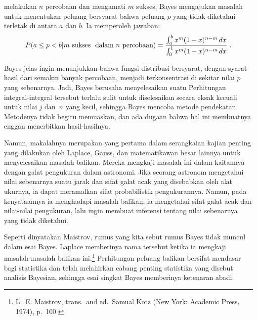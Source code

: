 melakukan
$n$ percobaan dan mengamati $m$ sukses.  Bayes mengajukan masalah untuk menentukan
peluang bersyarat bahwa peluang $p$ yang tidak diketahui terletak di antara $a$
dan $b$.  Ia memperoleh jawaban:
$$
P(a \leq p < b | m {\mbox{\,\,sukses\,\, dalam}}\,\,n \,\,{\mbox{percobaan}}) 
= \frac {\int_a^b x^m(1 - x)^{n - m}\,dx}{\int_0^1 x^m(1 - x)^{n - m}\,dx}\ .
$$
\par
{}  Bayes jelas
ingin menunjukkan bahwa fungsi distribusi bersyarat, dengan syarat hasil dari
semakin banyak percobaan, menjadi terkonsentrasi di sekitar nilai $p$ yang sebenarnya. 
Jadi, Bayes berusaha menyelesaikan suatu   Perhitungan
integral-integral tersebut terlalu sulit untuk diselesaikan secara eksak kecuali untuk nilai
$j$ dan~$n$ yang kecil, sehingga Bayes mencoba metode pendekatan.  Metodenya tidak
begitu memuaskan, dan ada dugaan bahwa hal ini membuatnya enggan
menerbitkan hasil-hasilnya.
\par
Namun, makalahnya merupakan yang pertama dalam serangkaian kajian penting yang dilakukan
oleh Laplace, Gauss, dan matematikawan besar lainnya untuk menyelesaikan masalah balikan. 
Mereka mengkaji masalah ini dalam kaitannya dengan galat pengukuran dalam astronomi.  Jika
seorang astronom mengetahui nilai sebenarnya suatu jarak dan sifat
galat acak yang disebabkan oleh alat ukurnya, ia dapat meramalkan sifat probabilistik
pengukurannya.  Namun, pada kenyataannya ia menghadapi masalah balikan:
ia mengetahui sifat galat acak dan nilai-nilai pengukuran, lalu ingin
membuat inferensi tentang nilai sebenarnya yang tidak diketahui.
\par
Seperti dinyatakan Maistrov, rumus yang kita sebut rumus Bayes tidak
muncul dalam esai Bayes.  Laplace memberinya nama tersebut ketika ia mengkaji masalah-masalah
balikan ini.\footnote{L.~E. Maistrov,  trans.~and ed.~Samual Kotz (New York: Academic Press, 1974), p.~100.}
Perhitungan peluang balikan bersifat mendasar bagi statistika dan telah
melahirkan cabang penting statistika yang disebut analisis Bayesian, sehingga
esai singkat Bayes memberinya ketenaran abadi.

